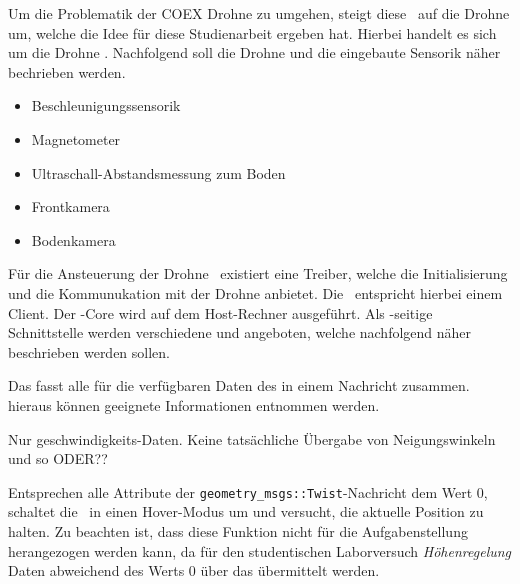 
Um die Problematik der COEX Drohne zu umgehen, steigt diese \Arbeit\ auf die Drohne um, welche die Idee für diese Studienarbeit ergeben hat.
Hierbei handelt es sich um die Drohne \Ar. Nachfolgend soll die Drohne und die eingebaute Sensorik näher bechrieben werden.



\begin{itemize}
\item Beschleunigungssensorik
\item Magnetometer
\item Ultraschall-Abstandsmessung zum Boden
\item Frontkamera
\item Bodenkamera
\end{itemize}








Für die Ansteuerung der Drohne \Ar\ existiert eine Treiber, welche die Initialisierung und die Kommunukation mit der Drohne anbietet. Die \Ar\ entspricht hierbei einem Client. Der \ROS-Core wird auf dem Host-Rechner ausgeführt.
Als \ROS-seitige Schnittstelle werden verschiedene \Topic[s] und \Service[s] angeboten, welche nachfolgend näher beschrieben werden sollen.










Das  fasst alle für die verfügbaren Daten des \Quad[s] in einem Nachricht zusammen. hieraus können geeignete Informationen entnommen werden.


Nur geschwindigkeits-Daten. Keine tatsächliche Übergabe von Neigungswinkeln und so ODER??
\missing\


Entsprechen alle Attribute der \texttt{geometry\_msgs::Twist}-Nachricht dem Wert 0, schaltet die \Ar\ in einen Hover-Modus um und versucht, die aktuelle Position zu halten. Zu beachten ist, dass diese Funktion nicht für die Aufgabenstellung herangezogen werden kann, da für den studentischen Laborversuch \textit{Höhenregelung} Daten abweichend des Werts 0 über das  übermittelt werden.


